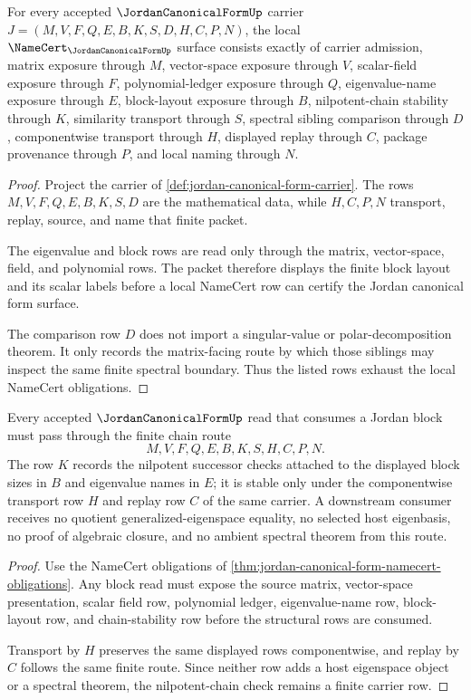 \begin{theorem}
\label{thm:jordan-canonical-form-namecert-obligations}
For every accepted $\JordanCanonicalFormUp$ carrier $J=(M,V,F,Q,E,B,K,S,D,H,C,P,N)$, the local $\NameCert_{\JordanCanonicalFormUp}$ surface consists exactly of carrier admission, matrix exposure through $M$, vector-space exposure through $V$, scalar-field exposure through $F$, polynomial-ledger exposure through $Q$, eigenvalue-name exposure through $E$, block-layout exposure through $B$, nilpotent-chain stability through $K$, similarity transport through $S$, spectral sibling comparison through $D$, componentwise transport through $H$, displayed replay through $C$, package provenance through $P$, and local naming through $N$.
\end{theorem}
\begin{proof}
Project the carrier of \autoref{def:jordan-canonical-form-carrier}. The rows $M,V,F,Q,E,B,K,S,D$ are the mathematical data, while $H,C,P,N$ transport, replay, source, and name that finite packet.

The eigenvalue and block rows are read only through the matrix, vector-space, field, and polynomial rows. The packet therefore displays the finite block layout and its scalar labels before a local NameCert row can certify the Jordan canonical form surface.

The comparison row $D$ does not import a singular-value or polar-decomposition theorem. It only records the matrix-facing route by which those siblings may inspect the same finite spectral boundary. Thus the listed rows exhaust the local NameCert obligations.
\end{proof}

\begin{theorem}
\label{thm:jordan-canonical-form-chain-stability}
Every accepted $\JordanCanonicalFormUp$ read that consumes a Jordan block must pass through the finite chain route
$$
M,V,F,Q,E,B,K,S,H,C,P,N .
$$
The row $K$ records the nilpotent successor checks attached to the displayed block sizes in $B$ and eigenvalue names in $E$; it is stable only under the componentwise transport row $H$ and replay row $C$ of the same carrier. A downstream consumer receives no quotient generalized-eigenspace equality, no selected host eigenbasis, no proof of algebraic closure, and no ambient spectral theorem from this route.
\end{theorem}
\begin{proof}
Use the NameCert obligations of \autoref{thm:jordan-canonical-form-namecert-obligations}. Any block read must expose the source matrix, vector-space presentation, scalar field row, polynomial ledger, eigenvalue-name row, block-layout row, and chain-stability row before the structural rows are consumed.

Transport by $H$ preserves the same displayed rows componentwise, and replay by $C$ follows the same finite route. Since neither row adds a host eigenspace object or a spectral theorem, the nilpotent-chain check remains a finite carrier row.
\end{proof}


